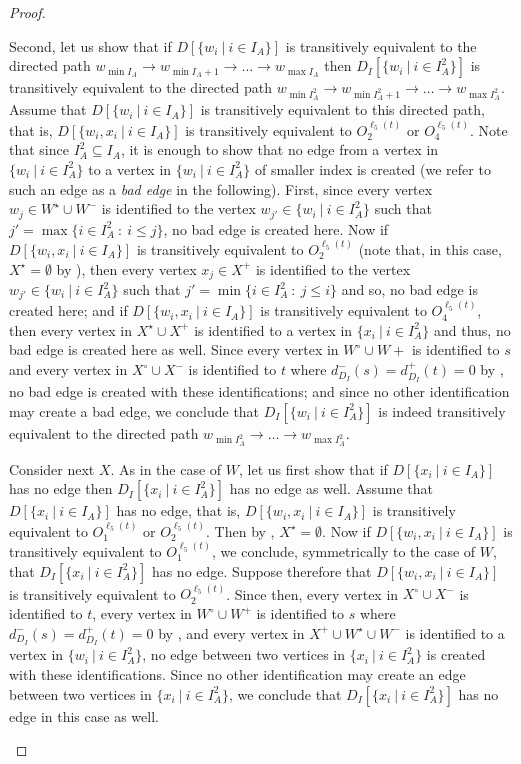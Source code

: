 \begin{proof}
\begin{claimproof}
Second, let us show that if $D[\{w_i~|~i \in I_A\}]$ is transitively equivalent to the directed path 
$w_{\min I_A} \rightarrow w_{\min I_A +1} \rightarrow \ldots \rightarrow w_{\max I_A}$ then
$D_I[\{w_i~|~i \in I_A^2\}]$ is transitively equivalent to the directed path 
$w_{\min I_A^2} \rightarrow w_{\min I_A^2 +1} \rightarrow \ldots \rightarrow w_{\max I_A^2}$.
Assume that $D[\{w_i~|~i \in I_A\}]$ is transitively equivalent to this directed path, 
that is, $D[\{w_i,x_i~|~i \in I_A\}]$ is transitively equivalent to $O_2^{\ell_5(t)}$ or $O_4^{\ell_5(t)}$.
Note that since $I_A^2 \subseteq I_A$, it is enough to show that no edge from a vertex in $\{w_i~|~i \in I_A^2\}$ to a vertex in $\{w_i~|~i \in I_A^2\}$ of smaller index is created (we refer to such an edge as a \emph{bad edge} in the following).
First, since every vertex $w_j \in W^\star \cup W^-$ is identified to the vertex $w_{j'} \in \{w_i~|~i \in I_A^2\}$ such that $j' = \max \{i \in I_A^2~:~ i \leq j\}$, no bad edge is created here.
Now if $D[\{w_i,x_i~|~i \in I_A\}]$ is transitively equivalent to $O_2^{\ell_5(t)}$ (note that, in this case, $X^\star = \emptyset$ by ), then every vertex $x_j \in X^+$ is identified to the vertex $w_{j'} \in \{w_i~|~i \in I_A^2\}$ such that $j' = \min \{i \in I_A^2~:~j \leq i\}$ and so, no bad edge is created here; and if $D[\{w_i,x_i~|~i \in I_A\}]$ is transitively equivalent to $O_4^{\ell_5(t)}$, then every vertex in $X^\star \cup X^+$ is identified to a vertex in $\{x_i~|~i \in I_A^2\}$ and thus, no bad edge is created here as well. 
Since every vertex in $W^\circ \cup W+$ is identified to $s$ and every vertex in $X^\circ \cup X^-$ is identified to $t$ where $d^-_{D_I}(s) = d^+_{D_I}(t) = 0$ by , no bad edge is created with these identifications;
and since no other identification may create a bad edge, we conclude that $D_I[\{w_i~|~i \in I_A^2\}]$ is indeed transitively equivalent to the directed path $w_{\min I_A^2} \rightarrow \ldots \rightarrow w_{\max I_A^2}$.

Consider next $X$. As in the case of $W$, let us first show that if $D[\{x_i~|~i \in I_A\}]$ has no edge then $D_I[\{x_i~|~i \in I_A^2\}]$ has no edge as well. 
Assume that $D[\{x_i~|~i \in I_A\}]$ has no edge, that is, $D[\{w_i,x_i~|~i \in I_A\}]$ is transitively equivalent to $O_1^{\ell_5(t)}$ or $O_2^{\ell_5(t)}$.
Then by , $X^\star = \emptyset$.
Now if $D[\{w_i,x_i~|~i \in I_A\}]$ is transitively equivalent to $O_1^{\ell_5(t)}$,
we conclude, symmetrically to the case of $W$, that $D_I[\{x_i~|~i \in I_A^2\}]$ has no edge.
Suppose therefore that $D[\{w_i,x_i~|~i \in I_A\}]$ is transitively equivalent to $O_2^{\ell_5(t)}$.
Since then, every vertex in $X^\circ \cup X^-$ is identified to $t$, every vertex in $W^\circ \cup W^+$ is identified to $s$  where $d^-_{D_I}(s) = d^+_{D_I}(t) = 0$ by ,
and every vertex in $X^+ \cup W^\star \cup W^-$ is identified to a vertex in $\{w_i~|~i \in I_A^2\}$, 
no edge between two vertices in $\{x_i~|~i \in I_A^2\}$ is created with these identifications.
Since no other identification may create an edge between two vertices in $\{x_i~|~i \in I_A^2\}$, 
we conclude that $D_I[\{x_i~|~i \in I_A^2\}]$ has no edge in this case as well.


\end{claimproof}
\end{proof}
